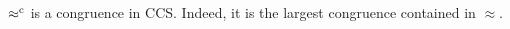 \begin{theorem}
\label{t:rapproxCongruence}
$\mathrel{\approx^{\rm{c}}}$ is a congruence in CCS. Indeed, it is the
largest congruence contained in $\approx$.
\end{theorem}  




